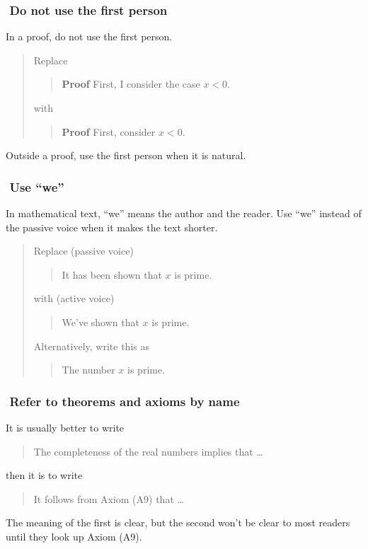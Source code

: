 \documentclass[12pt,fleqn]{article}
\newcounter{ex}\setcounter{ex}{0}
\newcommand{\ex}{%
\hspace{-0.2in} \setcounter{ex}{\value{ex}+1}
\theex \,\,}
\newcounter{id}\setcounter{id}{0}
\newcounter{se}\setcounter{se}{0}
\begin{document}
\subsubsection*{\ex  Do not use the first person} 

In a proof, do not  use the first person.  

\begin{quote}
Replace
\begin{quote}
\textbf{Proof } First, I consider the case \(x < 0\).
\end{quote}
with
\begin{quote}
 \textbf { Proof } First, consider \(x < 0\).
\end{quote}
\end{quote}

Outside a proof, use the first person when it is natural.

\subsubsection*{\ex  Use ``we''}

In mathematical text, ``we'' means the author and the reader.
Use ``we'' instead of the passive voice when it makes the 
text shorter.

\begin{quote}
Replace (passive voice)
\begin{quote}
  It has been shown that \(x\) is prime.
\end{quote}
with (active voice)
\begin{quote}
  We've shown that \(x\) is prime.
\end{quote}
Alternatively, write this as
\begin{quote}
  The number \(x\) is prime.
\end{quote}
\end{quote}

\subsubsection*{\ex  Refer to theorems and axioms by name}  

It is usually better to write
\begin{quote}
The completeness of the real numbers implies that \dots
\end{quote}
then it is to write
\begin{quote}
 It follows from Axiom  (A9) that \dots
\end{quote}
The meaning of the first is clear, but the second won't be clear
to most readers until they look up Axiom (A9).
\end{document}
